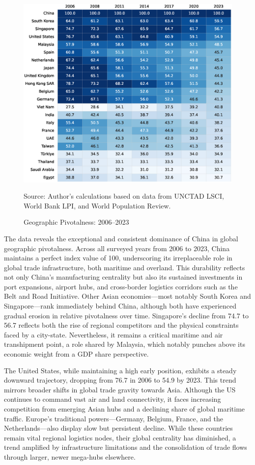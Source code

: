 \documentclass[11pt]{article}
\begin{document}
\begin{figure}[H]
	\caption{Geographic Pivotalness: 2006–2023}
	\label{fig:pivotal_geographic}
	\centering
        \phantom{a}
	\includegraphics[width=\textwidth]{dataviz/results_pivotal4_snapshot.eps}

	{\footnotesize Source: Author's calculations based on data from UNCTAD LSCI, World Bank LPI, and World Population Review.}
\end{figure}
 
The data reveals the exceptional and consistent dominance of China in global geographic pivotalness. Across all surveyed years from 2006 to 2023, China maintains a perfect index value of 100, underscoring its irreplaceable role in global trade infrastructure, both maritime and overland. This durability reflects not only China’s manufacturing centrality but also its sustained investments in port expansions, airport hubs, and cross-border logistics corridors such as the Belt and Road Initiative. Other Asian economies—most notably South Korea and Singapore—rank immediately behind China, although both have experienced gradual erosion in relative pivotalness over time. Singapore’s decline from 74.7 to 56.7 reflects both the rise of regional competitors and the physical constraints faced by a city-state. Nevertheless, it remains a critical maritime and air transhipment point, a role shared by Malaysia, which notably punches above its economic weight from a GDP share perspective.

The United States, while maintaining a high early position, exhibits a steady downward trajectory, dropping from 76.7 in 2006 to 54.9 by 2023. This trend mirrors broader shifts in global trade gravity towards Asia. Although the US continues to command vast air and land connectivity, it faces increasing competition from emerging Asian hubs and a declining share of global maritime traffic. Europe’s traditional powers—Germany, Belgium, France, and the Netherlands—also display slow but persistent decline. While these countries remain vital regional logistics nodes, their global centrality has diminished, a trend amplified by infrastructure limitations and the consolidation of trade flows through larger, newer mega-hubs elsewhere.
\end{document}
